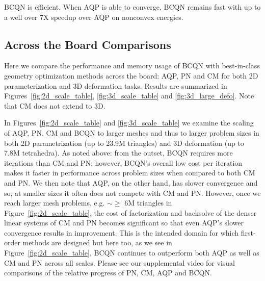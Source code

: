  BCQN is efficient. When AQP is able to converge, BCQN remains fast with up to a well over 7X speedup over AQP on nonconvex energies.

\subsection{Across the Board Comparisons} 

Here we compare the performance and memory usage of BCQN with best-in-class geometry optimization methods across the board: AQP, PN and CM for both 2D parameterization and 3D deformation tasks. Results are summarized in Figures\ \ref{fig:2d_scale_table}, \ref{fig:3d_scale_table} and \ref{fig:3d_large_defo}. Note that CM does not extend to 3D.

In Figures~\ref{fig:2d_scale_table} and \ref{fig:3d_scale_table} we examine the scaling of AQP, PN, CM and BCQN to larger meshes and thus to larger problem sizes in both 2D parametrization (up to 23.9M triangles) and 3D deformation (up to 7.8M tetrahedra). As noted above: from the outset, BCQN requires more iterations than CM and PN; however, BCQN's overall low cost per iteration makes it faster in performance across problem sizes when compared to both CM and PN. We then note that AQP, on the other hand, has slower convergence and so, at smaller sizes it often does not compete with CM and PN. However, once we reach larger mesh problems, e.g. $\sim\geq$ 6M triangles in Figure~\ref{fig:2d_scale_table}, the cost of factorization and backsolve of the denser linear systems of CM and PN becomes significant so that even AQP's slower convergence results in improvement. This is the intended domain for which first-order methods are designed but here too, as we see in Figure~\ref{fig:2d_scale_table}, BCQN continues to outperform both AQP as well as CM and PN across all scales. Please see our supplemental video for visual comparisons of the relative progress of PN, CM, AQP and BCQN.
